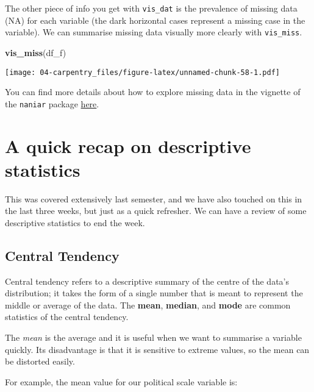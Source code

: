 \documentclass[
]{book}
\newenvironment{Shaded}{\begin{snugshade}}{\end{snugshade}}
\newcommand{\AttributeTok}[1]{\textcolor[rgb]{0.13,0.29,0.53}{#1}}
\newcommand{\ConstantTok}[1]{\textcolor[rgb]{0.56,0.35,0.01}{#1}}
\newcommand{\FunctionTok}[1]{\textcolor[rgb]{0.13,0.29,0.53}{\textbf{#1}}}
\newcommand{\NormalTok}[1]{#1}
\newcommand{\SpecialCharTok}[1]{\textcolor[rgb]{0.81,0.36,0.00}{\textbf{#1}}}
\begin{document}
The other piece of info you get with \texttt{vis\_dat} is the prevalence of missing data (NA) for each variable (the dark horizontal cases represent a missing case in the variable). We can summarise missing data visually more clearly with \texttt{vis\_miss}.

\begin{Shaded}
\begin{Highlighting}[]
\FunctionTok{vis\_miss}\NormalTok{(df\_f)}
\end{Highlighting}
\end{Shaded}

\texttt{[image: 04-carpentry\_files/figure-latex/unnamed-chunk-58-1.pdf]}

You can find more details about how to explore missing data in the vignette of the \texttt{naniar} package \href{http://naniar.njtierney.com/articles/getting-started-w-naniar.html}{here}.

\section{A quick recap on descriptive statistics}\label{a-quick-recap-on-descriptive-statistics}

This was covered extensively last semester, and we have also touched on this in the last three weeks, but just as a quick refresher. We can have a review of some descriptive statistics to end the week.

\subsection{Central Tendency}\label{central-tendency}

Central tendency refers to a descriptive summary of the centre of the data's distribution; it takes the form of a single number that is meant to represent the middle or average of the data. The \textbf{mean}, \textbf{median}, and \textbf{mode} are common statistics of the central tendency.

The \emph{mean} is the average and it is useful when we want to summarise a variable quickly. Its disadvantage is that it is sensitive to extreme values, so the mean can be distorted easily.

For example, the mean value for our political scale variable is:

\begin{Shaded}
\end{Shaded}
\end{document}
